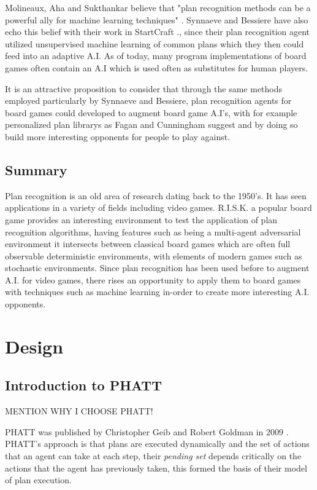 \documentclass[parskip]{cs4rep}
\begin{document}
Molineaux, Aha and Sukthankar believe that "plan recognition methods can be a powerful ally for machine learning techniques" \cite{Molineaux09g.:beating}. Synnaeve and Bessiere have also echo this belief with their work in StartCraft \cite{conf/aiide/SynnaeveB11}., since their plan recognition agent utilized unsupervised machine learning of common plans which they then could feed into an adaptive A.I. As of today, many program implementations of board games often contain an A.I which is used often as substitutes for human players.

It is an attractive proposition to consider that through the same methods employed particularly by Synnaeve and Bessiere, plan recognition agents for board games could developed to augment board game A.I's, with for example personalized plan librarys as Fagan and Cunningham suggest \cite{Fagan03case-basedplan} and by doing so build more interesting opponents for people to play against.

\section{Summary}

Plan recognition is an old area of research dating back to the 1950's. It has seen applications in a variety of fields including video games. R.I.S.K. a popular board game provides an interesting environment to test the application of plan recognition algorithms, having features such as being a multi-agent adversarial environment it intersects between classical board games which are often full observable deterministic environments, with elements of modern games such as stochastic environments. Since plan recognition has been used before to augment A.I. for video games, there rises an opportunity to apply them to board games with techniques such as machine learning in-order to create more interesting A.I. opponents.

\chapter{Design}

\section{Introduction to PHATT}

MENTION WHY I CHOOSE PHATT!

PHATT was published by Christopher Geib and Robert Goldman in 2009 \cite{Geib:2009:PPR:1550966.1551246}. PHATT's approach is that plans are executed dynamically and the set of actions that an agent can take at each step, their \textit{pending set} depends critically on the actions that the agent has previously taken, this formed the basis of their model of plan execution.
\end{document}
